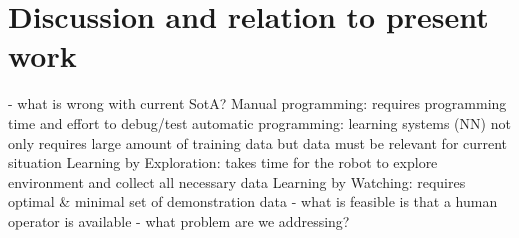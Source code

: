 \section{Discussion and relation to present work}
- what is wrong with current SotA?
Manual programming: requires programming time and effort to debug/test
automatic programming: learning systems (NN) not only requires large amount of training data but data must be relevant for current situation
Learning by Exploration: takes time for the robot to explore environment and collect all necessary data
Learning by Watching: requires optimal \& minimal set of demonstration data 
- what is feasible is that a human operator is available
- what problem are we addressing? 
